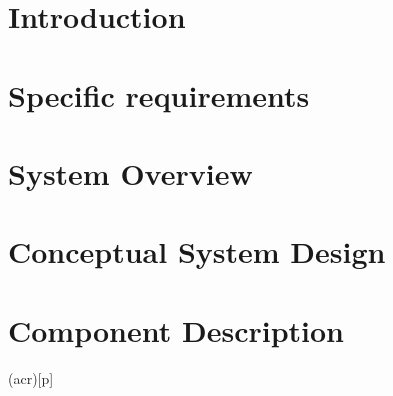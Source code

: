 \documentclass[a4paper,twoside,openright,makeidx,12pt]{book}
\begin{document}
\pagestyle{empty}
\renewcommand{\arraystretch}{1.8}



\tableofcontents


\pagestyle{fancy}
\cleardoublepage

\chapter{Introduction}
\label{Sec:SSD-Intoduction}



\newpage
\chapter{Specific requirements}
\label{Sec:SSD-SpecificRequirements}





\newpage
\chapter{System Overview}
\label{Sec:SSD-SystemOverview}

\newpage
\chapter{Conceptual System Design}
\label{Sec:SSD-ConceptualSystemDesign}

\newpage
\chapter{Component Description}
\label{Sec:SSD-ComponentDescription}



\newpage
\printglosstex(acr)[p]


\listoffigures
\listoftables
\cleardoublepage
%
%
\cleardoublepage
\end{document}
